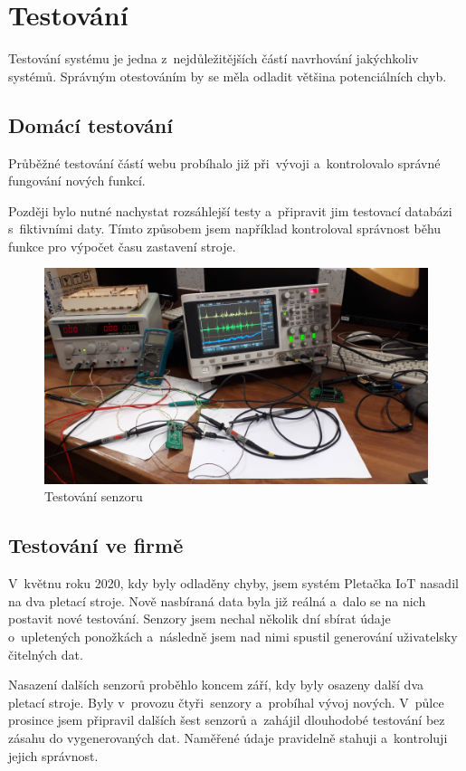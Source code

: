 \chapter{Testování}
Testování systému je jedna z~nejdůležitějších částí navrhování jakýchkoliv systémů.
Správným otestováním by se měla odladit většina potenciálních chyb.



\section{Domácí testování}
Průběžné testování částí webu probíhalo již při~vývoji a~kontrolovalo správné fungování nových funkcí.

Později bylo nutné nachystat rozsáhlejší testy a~připravit jim testovací databázi s~fiktivními daty.
Tímto způsobem jsem například kontroloval správnost běhu funkce pro výpočet času zastavení stroje.


\begin{figure}[htbp]
    \centering
    \includegraphics[width=\textwidth]{img/testovani.png}
    \caption{Testování senzoru}
    \label{fig:SenzorNaStroji}
\end{figure}

\section{Testování ve firmě}
V~květnu roku 2020, kdy byly odladěny chyby, jsem systém Pletačka IoT nasadil na dva pletací stroje.
Nově nasbíraná data byla již reálná a~dalo se na nich postavit nové testování.
Senzory jsem nechal několik dní sbírat údaje o~upletených ponožkách a~následně jsem nad nimi spustil generování uživatelsky čitelných dat.

Nasazení dalších senzorů proběhlo koncem září, kdy byly osazeny další dva ple\-ta\-cí stroje. 
Byly v provozu čtyři senzory a probíhal vývoj nových.
V půlce prosince jsem připravil dalších šest senzorů a~zahájil dlouhodobé testování bez zásahu do vygenerovaných dat. Naměřené údaje pravidelně stahuji a kontroluji jejich správnost.


